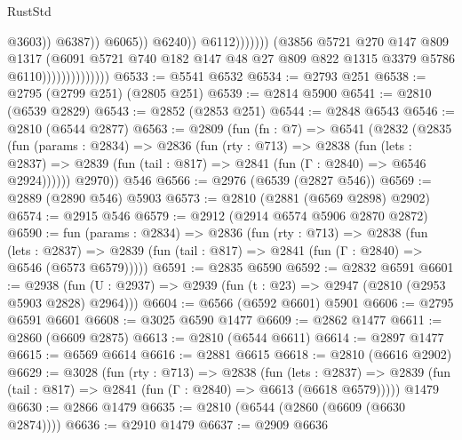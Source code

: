 \begin{lexlean}{RustStd}
\begin{coremodule}
                                                          @3603))
                                                      @6387))
                                                  @6065))
                                              @6240))
                                          @6112)))))))
                            (@3856
                              @5721
                              @270
                              @147
                              @809
                              @1317
                              (@6091
                                @5721
                                @740
                                @182
                                @147
                                @48
                                @27
                                @809
                                @822
                                @1315
                                @3379
                                @5786
                                @6110))))))))))))))
@6533 := @5541 @6532
@6534 := @2793 @251
@6538 := @2795 (@2799 @251) (@2805 @251)
@6539 := @2814 @5900
@6541 := @2810 (@6539 @2829)
@6543 := @2852 (@2853 @251)
@6544 := @2848 @6543
@6546 := @2810 (@6544 @2877)
@6563 := @2809
    (fun (fn : @7) =>
    @6541
      (@2832
        (@2835
          (fun (params : @2834) =>
          @2836
            (fun (rty : @713) =>
            @2838
              (fun (lets : @2837) =>
              @2839 (fun (tail : @817) => @2841 (fun (Γ : @2840) => @6546 @2924))))))
        @2970))
    @546
@6566 := @2976 (@6539 (@2827 @546))
@6569 := @2889 (@2890 @546) @5903
@6573 := @2810 (@2881 (@6569 @2898) @2902)
@6574 := @2915 @546
@6579 := @2912 (@2914 @6574 @5906 @2870 @2872)
@6590 := fun (params : @2834) =>
  @2836
    (fun (rty : @713) =>
    @2838
      (fun (lets : @2837) =>
      @2839 (fun (tail : @817) => @2841 (fun (Γ : @2840) => @6546 (@6573 @6579)))))
@6591 := @2835 @6590
@6592 := @2832 @6591
@6601 := @2938 (fun (U : @2937) => @2939 (fun (t : @23) => @2947 (@2810 (@2953 @5903 @2828) @2964)))
@6604 := @6566 (@6592 @6601) @5901
@6606 := @2795 @6591 @6601
@6608 := @3025 @6590 @1477
@6609 := @2862 @1477
@6611 := @2860 (@6609 @2875)
@6613 := @2810 (@6544 @6611)
@6614 := @2897 @1477
@6615 := @6569 @6614
@6616 := @2881 @6615
@6618 := @2810 (@6616 @2902)
@6629 := @3028
    (fun (rty : @713) =>
    @2838
      (fun (lets : @2837) =>
      @2839 (fun (tail : @817) => @2841 (fun (Γ : @2840) => @6613 (@6618 @6579)))))
    @1479
@6630 := @2866 @1479
@6635 := @2810 (@6544 (@2860 (@6609 (@6630 @2874))))
@6636 := @2910 @1479
@6637 := @2909 @6636

\end{coremodule}
\end{lexlean}
